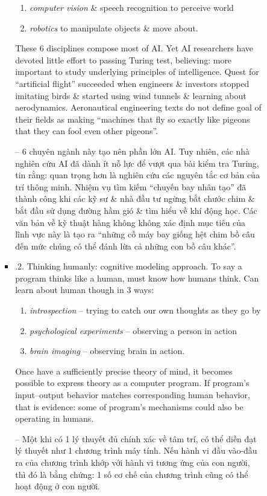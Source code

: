 \documentclass{article}
\begin{document}
\begin{itemize}
\begin{itemize}
\begin{itemize}
\begin{itemize}
\begin{enumerate}
					\item {\it computer vision} \& speech recognition to perceive world
					\item {\it robotics} to manipulate objects \& move about.
				\end{enumerate}
				These 6 disciplines compose most of AI. Yet AI researchers have devoted little effort to passing Turing test, believing: more important to study underlying principles of intelligence. Quest for ``artificial flight'' succeeded when engineers \& investors stopped imitating birds \& started using wind tunnels \& learning about aerodynamics. Aeronautical engineering texts do not define goal of their fields as making ``machines that fly so exactly like pigeons that they can fool even other pigeons''.
				
				-- 6 chuyên ngành này tạo nên phần lớn AI. Tuy nhiên, các nhà nghiên cứu AI đã dành ít nỗ lực để vượt qua bài kiểm tra Turing, tin rằng: quan trọng hơn là nghiên cứu các nguyên tắc cơ bản của trí thông minh. Nhiệm vụ tìm kiếm ``chuyến bay nhân tạo'' đã thành công khi các kỹ sư \& nhà đầu tư ngừng bắt chước chim \& bắt đầu sử dụng đường hầm gió \& tìm hiểu về khí động học. Các văn bản về kỹ thuật hàng không không xác định mục tiêu của lĩnh vực này là tạo ra ``những cỗ máy bay giống hệt chim bồ câu đến mức chúng có thể đánh lừa cả những con bồ câu khác''.
				\item {.2. Thinking humanly: cognitive modeling approach.} To say a program thinks like a human, must know how humans think. Can learn about human though in 3 ways:
				\begin{enumerate}
					\item {\it introspection} -- trying to catch our own thoughts as they go by
					\item {\it psychological experiments} -- observing a person in action
					\item {\it brain imaging} -- observing brain in action.
				\end{enumerate}
				Once have a sufficiently precise theory of mind, it becomes possible to express theory as a computer program. If program's input--output behavior matches corresponding human behavior, that is evidence: some of program's mechanisms could also be operating in humans.
				
				-- Một khi có 1 lý thuyết đủ chính xác về tâm trí, có thể diễn đạt lý thuyết như 1 chương trình máy tính. Nếu hành vi đầu vào-đầu ra của chương trình khớp với hành vi tương ứng của con người, thì đó là bằng chứng: 1 số cơ chế của chương trình cũng có thể hoạt động ở con người.
				

\end{itemize}
\end{itemize}
\end{itemize}
\end{itemize}
\end{document}
